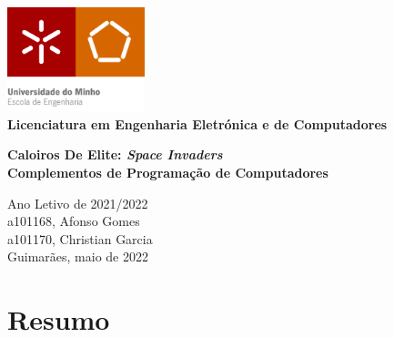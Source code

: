 \documentclass[a4paper,11pt]{article}
\begin{document}
\renewcommand{\listfigurename}{Índice de figuras}

\renewcommand{\listtablename}{Índice de tabelas}


\begin{titlepage}


    \begin{center}
        \includegraphics[width=0.3\textwidth]{0 - Capa/EEUMfinal.png}\\
        \vspace{0.2cm}
        \textbf{Licenciatura em Engenharia Eletrónica e de Computadores}
        \vfill

        \textbf{\Large{Caloiros De Elite: \textit{Space Invaders}}}\\
        \vspace{0.2cm}
        \textbf{\large{Complementos de Programação de Computadores}}\\

        \vfill


        Ano Letivo de 2021/2022\\
        \vspace{0.2pt}
        a101168, Afonso Gomes\\
        a101170, Christian Garcia\\
        \vspace{0.2pt}
        Guimarães, maio de 2022  \vspace{0.8cm}
    \end{center}        %
\end{titlepage}     %



\pagebreak




\setcounter{secnumdepth}{-1}
\section{Resumo}
\end{document}
